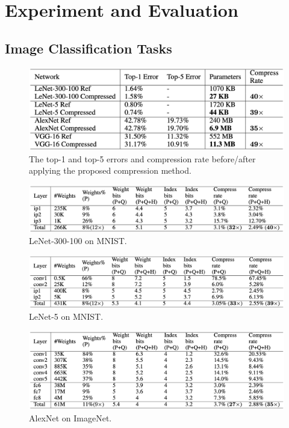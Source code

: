 \documentclass[12pt]{article}
\begin{document}
\section{Experiment and Evaluation}

\subsection{Image Classification Tasks}

\begin{figure}
    \centering
    \includegraphics[width=0.9\linewidth]{images/t1_result.png}
    \caption{The top-1 and top-5 errors and compression rate before/after applying the proposed compression method.}
    \label{fig:result}
\end{figure}

\begin{figure}
    \centering
    \includegraphics[width=0.9\linewidth]{images/t2_lenet_300_100.png}
    \caption{LeNet-300-100 on MNIST.}
    \label{fig:lenet_300_100}
\end{figure}

\begin{figure}
    \centering
    \includegraphics[width=0.9\linewidth]{images/t3_lenet5.png}
    \caption{LeNet-5 on MNIST.}
    \label{fig:lenet5}
\end{figure}

\begin{figure}
    \centering
    \includegraphics[width=0.9\linewidth]{images/t4_alexnet.png}
    \caption{AlexNet on ImageNet.}
    \label{fig:alexnet}
\end{figure}
\end{document}
